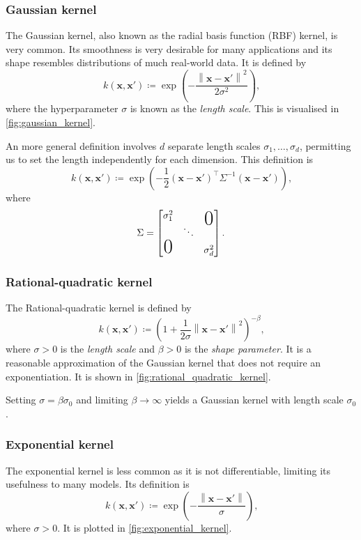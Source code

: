 \documentclass[11pt,twoside,openright]{report}
\newcommand\bx{\mathbf{x}}
\newcommand\norm[1]{\left\|#1\right\|}
\begin{document}
\subsubsection{Gaussian kernel}

The Gaussian kernel, also known as the radial basis function (RBF) kernel, is very common. Its smoothness is very desirable for many applications and its shape resembles distributions of much real-world data. It is defined by \[
    k(\bx, \bx') \coloneqq \exp\left( - \frac{\norm{\bx - \bx'}^2}{2\sigma^2} \right) \text{,}
\] where the hyperparameter $\sigma$ is known as the \textit{length scale}. This is visualised in \cref{fig:gaussian_kernel}.

An more general definition involves $d$ separate length scales $\sigma_1, \dots, \sigma_d$, permitting us to set the length independently for each dimension. This definition is \[
    k(\bx, \bx') \coloneqq \exp\left( - \frac{1}{2}\left(\bx - \bx'\right)^\top\Sigma^{-1}\left(\bx - \bx'\right) \right) \text{,}
\] where \[
    \Sigma = \begin{bmatrix}
        \sigma_1^2 & & \makebox(0,0){\text{\huge0}} \\
        & \ddots & \\
        \mbox{\huge 0} & & \sigma_d^2
    \end{bmatrix} \text{.}
\]

\subsubsection{Rational-quadratic kernel}

The Rational-quadratic kernel is defined by \[
    k(\bx, \bx') \coloneqq \left(1 + \frac{1}{2\sigma}\norm{\bx - \bx'}^2\right)^{-\beta} \text{,}
\] where $\sigma > 0$ is the \textit{length scale} and $\beta > 0$ is the \textit{shape parameter}. It is a reasonable approximation of the Gaussian kernel that does not require an exponentiation. It is shown in \cref{fig:rational_quadratic_kernel}.

Setting $\sigma = \beta \sigma_0$ and limiting $\beta \to \infty$ yields a Gaussian kernel with length scale $\sigma_0$.

\subsubsection{Exponential kernel}

  The exponential kernel is less common as it is not differentiable, limiting its usefulness to many models. Its definition is \[
    k(\bx, \bx') \coloneqq \exp\left( - \frac{\norm{\bx - \bx'}}{\sigma} \right) \text{,}
  \] where $\sigma > 0$. It is plotted in \cref{fig:exponential_kernel}.
\end{document}
